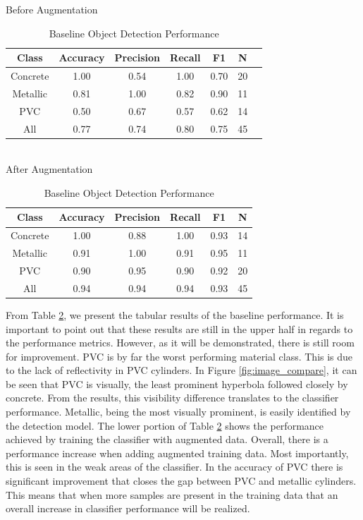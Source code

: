 \begin{table}[H]
\begin{center}
    Before Augmentation\\
    \begin{tabular}{ |c|c|c|c|c|c|c|}
        \hline
        Class & Accuracy & Precision & Recall & F1 & N \\
        \hline
        Concrete & 1.00 & 0.54 & 1.00 & 0.70 & 20\\ 
        Metallic & 0.81 & 1.00 & 0.82 & 0.90 & 11\\  
        PVC      & 0.50 & 0.67 & 0.57 & 0.62 & 14\\
        \hline
        All      & 0.77 & 0.74 & 0.80 & 0.75 & 45\\
        \hline
    \end{tabular} \\

    After Augmentation \\
    \begin{tabular}{ |c|c|c|c|c|c|}
        \hline
        Class & Accuracy & Precision & Recall & F1 & N \\
        \hline
        Concrete & 1.00 & 0.88 & 1.00 & 0.93 & 14\\ 
        Metallic & 0.91 & 1.00 & 0.91 & 0.95 & 11\\  
        PVC      & 0.90 & 0.95 & 0.90 & 0.92 & 20\\
        \hline
        All      & 0.94 & 0.94 & 0.94 & 0.93 & 45\\
        \hline
    \end{tabular}
\end{center}
\caption{Baseline Object Detection Performance}
\label{table:baseline}
\end{table}

From Table \ref{table:baseline}, we present the tabular results of the baseline performance. It is important to point out that these results are still in the upper half in regards to the performance metrics. However, as it will be demonstrated, there is still room for improvement. PVC is by far the worst performing material class. This is due to the lack of reflectivity in PVC cylinders. In Figure \ref{fig:image_compare}, it can be seen that PVC is visually, the least prominent hyperbola followed closely by concrete. From the results, this visibility difference translates to the classifier performance. Metallic, being the most visually prominent, is easily identified by the detection model. The lower portion of Table \ref{table:baseline} shows the performance achieved by training the classifier with augmented data. Overall, there is a performance increase when adding augmented training data. Most importantly, this is seen in the weak areas of the classifier. In the accuracy of PVC there is significant improvement that closes the gap between PVC and metallic cylinders. This means that when more samples are present in the training data that an overall increase in classifier performance will be realized.

